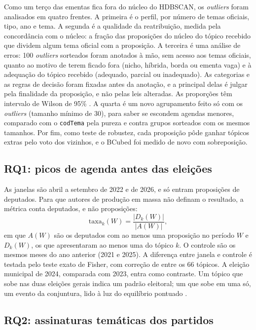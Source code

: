Como um terço das ementas fica fora do núcleo do HDBSCAN, os \textit{outliers} foram analisados em quatro frentes. A primeira é o perfil, por número de temas oficiais, tipo, ano e tema. A segunda é a qualidade da reatribuição, medida pela concordância com o núcleo: a fração das proposições do núcleo do tópico recebido que dividem algum tema oficial com a proposição. A terceira é uma análise de erros: 100 \textit{outliers} sorteados foram anotados à mão, sem acesso aos temas oficiais, quanto ao motivo de terem ficado fora (nicho, híbrida, borda ou ementa vaga) e à adequação do tópico recebido (adequado, parcial ou inadequado). As categorias e as regras de decisão foram fixadas antes da anotação, e a principal delas é julgar pela finalidade da proposição, e não pelas leis alteradas. As proporções têm intervalo de Wilson de 95\% \citep{wilson1927probable}. A quarta é um novo agrupamento feito só com os \textit{outliers} (tamanho mínimo de 30), para saber se escondem agendas menores, comparado com o \texttt{codTema} pela pureza e contra grupos sorteados com os mesmos tamanhos. Por fim, como teste de robustez, cada proposição pôde ganhar tópicos extras pelo voto dos vizinhos, e o BCubed foi medido de novo com sobreposição.

\subsection{RQ1: picos de agenda antes das eleições}
\label{subsec:rq1}

As janelas são abril a setembro de 2022 e de 2026, e só entram proposições de deputados. Para que autores de produção em massa não definam o resultado, a métrica conta deputados, e não proposições:
\begin{equation}
\text{taxa}_k(W) = \frac{|D_k(W)|}{|A(W)|},
\end{equation}
em que $A(W)$ são os deputados com ao menos uma proposição no período $W$ e $D_k(W)$, os que apresentaram ao menos uma do tópico $k$. O controle são os mesmos meses do ano anterior (2021 e 2025). A diferença entre janela e controle é testada pelo teste exato de Fisher, com correção de \citet{benjamini1995controlling} entre os 66 tópicos. A eleição municipal de 2024, comparada com 2023, entra como contraste. Um tópico que sobe nas duas eleições gerais indica um padrão eleitoral; um que sobe em uma só, um evento da conjuntura, lido à luz do equilíbrio pontuado \citep{baumgartner1993agendas}.

\subsection{RQ2: assinaturas temáticas dos partidos}
\label{subsec:rq2}

